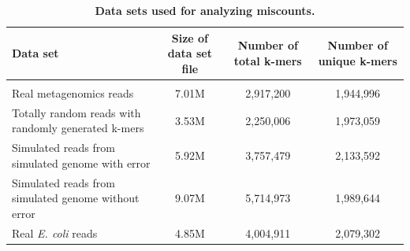 \documentclass[10pt]{article}
\begin{document}


% 


\begin{table}[!ht]
\caption{
\bf{Data sets used for analyzing miscounts.}}
\begin{tabular}{ | p{5cm} | c | c | c |}
Data set & Size of data set file & Number of total k-mers & Number of unique k-mers \\
\hline \\
Real metagenomics reads                                  & 7.01M  & 2,917,200  & 1,944,996 \\
\hline
Totally random reads with randomly generated k-mers      & 3.53M  & 2,250,006  & 1,973,059 \\
\hline
Simulated reads from simulated genome with error         & 5.92M  & 3,757,479  & 2,133,592 \\
\hline
Simulated reads from simulated genome without error      & 9.07M  & 5,714,973  & 1,989,644 \\
\hline
Real {\em E. coli} reads                                        & 4.85M  & 4,004,911  & 2,079,302 \\
\end{tabular}
\begin{flushleft}
\end{flushleft}
\label{table:random_data}
\end{table}



\end{document}
